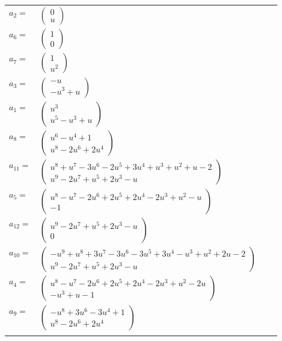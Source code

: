 \documentclass[1p]{elsarticle_modified}
\theoremstyle{definition}
\begin{document}
\begin{tabular}{m{7pt} m{180pt} m{7pt} m{180pt} }
\flushright $a_{2}=$&$\begin{pmatrix}0\\u\end{pmatrix}$ \\
\flushright $a_{6}=$&$\begin{pmatrix}1\\0\end{pmatrix}$ \\
\flushright $a_{7}=$&$\begin{pmatrix}1\\u^2\end{pmatrix}$ \\
\flushright $a_{3}=$&$\begin{pmatrix}- u\\- u^3+u\end{pmatrix}$ \\
\flushright $a_{1}=$&$\begin{pmatrix}u^3\\u^5- u^3+u\end{pmatrix}$ \\
\flushright $a_{8}=$&$\begin{pmatrix}u^6- u^4+1\\u^8-2 u^6+2 u^4\end{pmatrix}$ \\
\flushright $a_{11}=$&$\begin{pmatrix}u^8+u^7-3 u^6-2 u^5+3 u^4+u^3+u^2+u-2\\u^9-2 u^7+u^5+2 u^3- u\end{pmatrix}$ \\
\flushright $a_{5}=$&$\begin{pmatrix}u^8- u^7-2 u^6+2 u^5+2 u^4-2 u^3+u^2- u\\-1\end{pmatrix}$ \\
\flushright $a_{12}=$&$\begin{pmatrix}u^9-2 u^7+u^5+2 u^3- u\\0\end{pmatrix}$ \\
\flushright $a_{10}=$&$\begin{pmatrix}- u^9+u^8+3 u^7-3 u^6-3 u^5+3 u^4- u^3+u^2+2 u-2\\u^9-2 u^7+u^5+2 u^3- u\end{pmatrix}$ \\
\flushright $a_{4}=$&$\begin{pmatrix}u^8- u^7-2 u^6+2 u^5+2 u^4-2 u^3+u^2-2 u\\- u^3+u-1\end{pmatrix}$ \\
\flushright $a_{9}=$&$\begin{pmatrix}- u^8+3 u^6-3 u^4+1\\u^8-2 u^6+2 u^4\end{pmatrix}$\\&\end{tabular}
\end{document}
